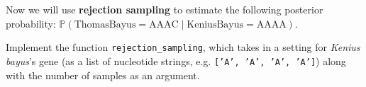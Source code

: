 \item {}

Now we will use \textbf{rejection sampling} to estimate the following posterior probability: $\mathbb{P}(\text{ThomasBayus} = \text{AAAC} \mid \text{KeniusBayus} = \text{AAAA})$.

Implement the function \texttt{rejection\_sampling}, which takes in a setting for \textit{Kenius bayus}'s gene (as a list of nucleotide strings, e.g. \texttt{['A', 'A', 'A', 'A']}) along with the number of samples as an argument.

